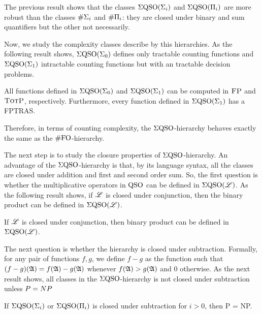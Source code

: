 \newcommand{\pP}{\textit{P}}
\newcommand{\pN}{\textit{N}}
\newcommand{\pV}{\textit{V}}
\newcommand{\pT}{\textit{T}}
\newcommand{\pA}{\textit{A}}
\newcommand{\pNC}{\textit{NC}}
\newcommand{\pD}{\textit{D}}


The previous result shows that the classes $\Sigma{\rm QSO}(\Sigma_{i})$ and $\Sigma{\rm QSO}(\Pi_{i})$ are more robust than the classes $\#\Sigma_{i}$ and $\#\Pi_{i}$: they are closed under binary and sum quantifiers but the other not necessarily. 

Now, we study the complexity classes describe by this hierarchies. As the following result shows, $\Sigma{\rm QSO}(\Sigma_{0})$ defines only tractable counting functions and $\Sigma{\rm QSO}(\Sigma_{1})$ intractable counting functions but with an tractable decision problems. 
\begin{proposition} \label{prop:qe0-fp-qe1-totp-fptras}
All functions defined in $\Sigma{\rm QSO}(\Sigma_{0})$ and $\Sigma{\rm QSO}(\Sigma_{1})$ can be computed in $\text{\sc FP}$ and $\text{\sc TotP}$, respectively. Furthermore, every function defined in $\Sigma{\rm QSO}(\Sigma_{1})$ has a FPTRAS.
\end{proposition}
Therefore, in terms of counting complexity, the $\Sigma{\rm QSO}$-hierarchy behaves exactly the same as the $\#{\rm FO}$-hierarchy.

The next step is to study the closure properties of $\Sigma{\rm QSO}$-hierarchy. 
An advantage of the $\Sigma{\rm QSO}$-hierarchy is that, by its language syntax, all the classes are closed under addition and first and second order sum.
So, the first question is whether the multiplicative operators in ${\rm QSO}$ can be defined in $\Sigma{\rm QSO}(\mathscr{L})$. As the following result shows, if $\mathscr{L}$ is closed under conjunction, then the binary product can be defined in  $\Sigma{\rm QSO}(\mathscr{L})$.
\begin{theorem}\label{theo:binary-prod}
	If $\mathscr{L}$ is closed under conjunction, then binary product can be defined in $\Sigma{\rm QSO}(\mathscr{L})$.
\end{theorem}
The next question is whether the hierarchy is closed under subtraction. Formally, for any pair of functions $f,g$, we define $f - g$ as the function such that $(f - g)(\mathfrak{A}) = f(\mathfrak{A})-g(\mathfrak{A})$ whenever $f(\mathfrak{A})>g(\mathfrak{A})$ and $0$ otherwise.
As the next result shows, all classes in the $\Sigma{\rm QSO}$-hierarchy is not closed under subtraction unless ${\sc P} = {\sc NP}$
\begin{theorem} \label{sub-pnp}
If $\Sigma{\rm QSO}(\Sigma_{i})$ or $\Sigma{\rm QSO}(\Pi_{i})$ is closed under subtraction for $i > 0$, then {\sc P} = {\sc NP}.
\end{theorem}

